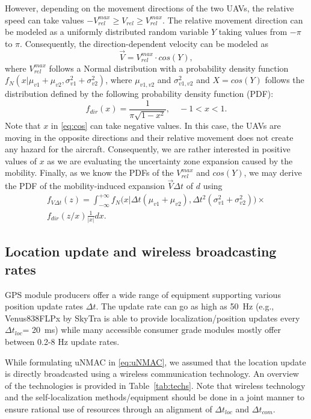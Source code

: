\documentclass[conference]{IEEEtran}
\begin{document}
However, depending on the movement directions of the two UAVs, the relative speed can take values $-V_{rel}^{max}\geq V_{rel}\geq V_{rel}^{max}$. The relative movement direction can be modeled as a uniformly distributed random variable $Y$ taking values from $-\pi$ to $\pi$. Consequently, the direction-dependent velocity can be modeled as
\begin{equation}
    \vec{V}= V_{rel}^{max} \cdot cos(Y),
\end{equation}
where $V_{rel}^{max}$ follows a Normal distribution with a probability density function $f_{N}(x|\mu_{v1}+\mu_{v2},\sigma^2_{v1}+\sigma^2_{v2})$, where $\mu_{v1, v2}$ and $\sigma^2_{v1,v2}$ and $X=cos(Y)$ follows the distribution defined by the following probability density function (PDF):
\begin{equation}\label{eq:cos}
    f_{dir}(x)=\frac{1}{\pi \sqrt{1-x^2}}, \quad -1<x<1.
\end{equation}
Note that $x$ in \eqref{eq:cos} can take negative values. In this case, the UAVs are moving in the opposite directions and their relative movement does not create any hazard for the aircraft. Consequently, we are rather interested in positive values of $x$ as we are evaluating the uncertainty zone expansion caused by the mobility. Finally, as we know the PDFs of the $ V_{rel}^{max}$ and $cos(Y)$, we may derive the PDF of the mobility-induced expansion $\vec{V}\Delta t$ of $d$ using
\begin{eqnarray}
    f_{V\Delta t}(z)=  \int_{-\infty}^{+\infty} f_{N}\Big(x|\Delta t(\mu_{v1}+\mu_{v2}),\Delta t^2(\sigma^2_{v1}+\sigma^2_{v2})\Big)\times\nonumber \\f_{dir}(z/x)\frac{1}{|x|} dx.
\end{eqnarray}

\subsection{Location update and wireless broadcasting rates}
GPS module producers offer a wide range of equipment supporting various position update rates $\Delta t$. The update rate can go as high as 50~Hz (e.g., Venus838FLPx by SkyTra is able to provide localization/position updates every $\Delta t_{loc}$= 20~ms) while many accessible consumer grade modules mostly offer between 0.2-8 Hz update rates.

While formulating uNMAC in \eqref{eq:uNMAC}, we assumed that the location update is directly broadcasted using a wireless communication technology. An overview of the technologies is provided in Table~\ref{tab:techs}. Note that wireless technology and the self-localization methods/equipment should be done in a joint manner to ensure rational use of resources through an alignment of $\Delta t_{loc}$ and $\Delta t_{com}$.
\end{document}
